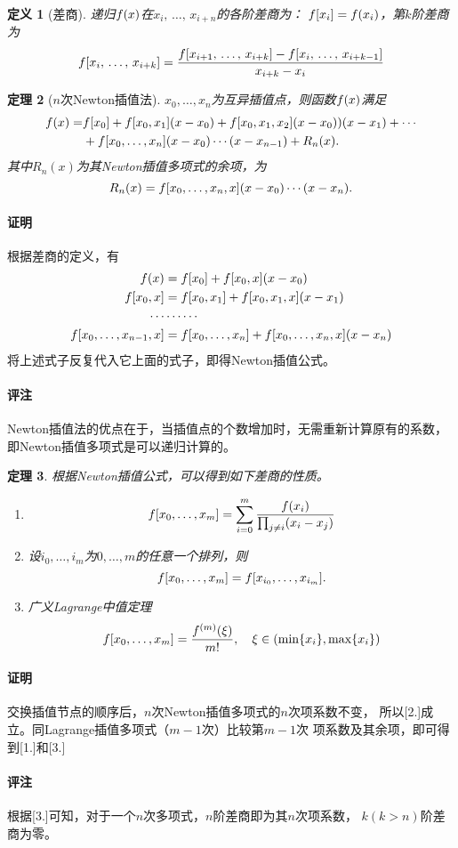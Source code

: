 \documentclass[12pt, a4paper]{article}
\theoremstyle{margin}
\newtheorem{thm}{定理}
\newtheorem{defi}[thm]{定义}
\newcommand{\f}{\mathnormal{f}}
\newcommand{\remark}{\paragraph{评注}}
\newcommand{\proof}{\paragraph{证明}}
\begin{document}
  \begin{defi}[差商]
    递归$\f(x)$在$x_{i},\,\dots,\,x_{i+n}$的各阶差商为：
    $\f[x_i] = \f(x_i)$，第$k$阶差商为
    \[
      \f[x_i,\,\dots,\,x_{i+k}] =
      \frac{\f[x_{i+1},\,\dots,\,x_{i+k}] - \f[x_i,\,\dots,\,x_{i+k-1}]}
      {x_{i+k} - x_i}
    \]
  \end{defi}


  \begin{thm}[$n$次Newton插值法]
    \label{thm: Newton插值法}
    $x_0,\dots,x_n$为互异插值点，则函数$\f(x)$满足
    \[\begin{split}
      \f(x) =& \f[x_0] + \f[x_0, x_1](x-x_0) + \f[x_0,x_1,x_2](x-x_0))(x-x_1) + \cdots \\
      & + \f[x_0,\dots,x_n](x-x_0)\cdots(x-x_{n-1}) + R_n(x).
    \end{split}\]
    其中$R_n(x)$为其Newton插值多项式的余项，为
    \[
      R_n(x) = \f[x_0,\dots,x_n,x](x-x_0)\cdots(x-x_n).
    \]
  \end{thm}
  \proof
    根据差商的定义，有
    \[\begin{split}
      \f(x) &= \f[x_0] + \f[x_0, x](x-x_0) \\
      \f[x_0, x] &= \f[x_0, x_1] + \f[x_0, x_1, x](x-x_1) \\
      \cdots & \cdots\cdots \\
      \f[x_0,\dots,x_{n-1}, x] &= \f[x_0,\dots,x_n] +
      \f[x_0,\dots,x_n,x](x-x_n)
    \end{split}\]
    将上述式子反复代入它上面的式子，即得Newton插值公式。
  \remark
    Newton插值法的优点在于，当插值点的个数增加时，无需重新计算原有的系数，
    即Newton插值多项式是可以递归计算的。

  \begin{thm}
    根据Newton插值公式，可以得到如下差商的性质。
    \begin{enumerate}
      \item
      \[
        \f[x_0,\dots,x_m] =
        \sum_{i=0}^m\frac{\f(x_i)}{\prod_{j\ne i}(x_i-x_j)}
      \]
      \item 设$i_0,\dots,i_m$为$0,\dots, m$的任意一个排列，则
      \[
        \f[x_0,\dots,x_m] = \f[x_{i_0},\dots,x_{i_m}].
      \]
      \item 广义Lagrange中值定理
      \[
        \f[x_0,\dots,x_m] = \frac{\f^{(m)}(\xi)}{m!},\quad
        \xi\in(\min\{x_i\}, \max\{x_i\})
      \]
    \end{enumerate}
  \end{thm}
  \proof
    交换插值节点的顺序后，$n$次Newton插值多项式的$n$次项系数不变，
    所以[2.]成立。同Lagrange插值多项式（$m-1$次）比较第$m-1$次
    项系数及其余项，即可得到[1.]和[3.]
  \remark
    根据[3.]可知，对于一个$n$次多项式，$n$阶差商即为其$n$次项系数，
    $k(k>n)$阶差商为零。
\end{document}
